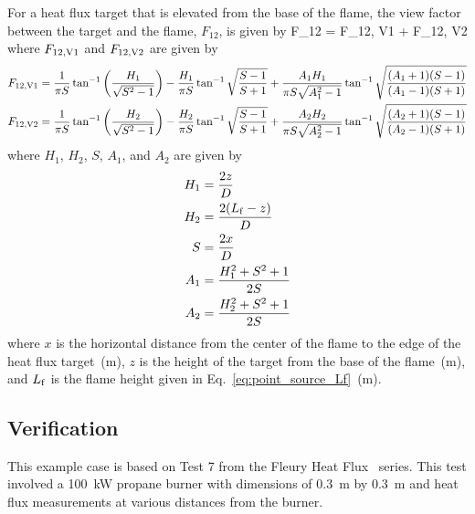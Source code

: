 \noindent For a heat flux target that is elevated from the base of the flame, the view factor between the target and the flame, $F_{12}$, is given by
\be
F_{12} = F_{\rm 12, V1} + F_{\rm 12, V2}
\label{eq:solid_flame_F12_V1V2}
\ee
where $F_{\rm 12, V1}$ and $F_{\rm 12, V2}$ are given by
\begin{align}
F_{\rm 12, V1} &= \frac{1}{\pi S} \tan^{-1} \left( \frac{H_1}{\sqrt{S^2-1}} \right) - \frac{H_1}{\pi S} \tan^{-1} \sqrt{\frac{S-1}{S+1}} +
\frac{A_1 H_1}{\pi S \sqrt{A_1^2-1}} \tan^{-1} \sqrt{\frac{(A_1+1)(S-1)}{(A_1-1)(S+1)}} \\
F_{\rm 12, V2} &= \frac{1}{\pi S} \tan^{-1} \left( \frac{H_2}{\sqrt{S^2-1}} \right) - \frac{H_2}{\pi S} \tan^{-1} \sqrt{\frac{S-1}{S+1}} +
\frac{A_2 H_2}{\pi S \sqrt{A_2^2-1}} \tan^{-1} \sqrt{\frac{(A_2+1)(S-1)}{(A_2-1)(S+1)}}
\label{eq:solid_flame_F12_V1_V2}
\end{align}
where $H_1$, $H_2$, $S$, $A_1$, and $A_2$ are given by
\begin{align}
H_1 &= \frac{2 z}{D}                \\
H_2 &= \frac{2 (L_{\rm f}-z)}{D}      \\
S   &= \frac{2 x}{D}                \\
A_1 &= \frac{H_1^2 + S^2 + 1}{2 S}  \\
A_2 &= \frac{H_2^2 + S^2 + 1}{2 S}
\label{eq:solid_flame_H_S_A}
\end{align}
where $x$ is the horizontal distance from the center of the flame to the edge of the heat
flux target~(\si{m}), $z$ is the height of the target from the base of the flame~(\si{m}),
and $L_{\rm f}$ is the flame height given in Eq.~\ref{eq:point_source_Lf}~(\si{m}).


\clearpage


\subsection*{Verification}

This example case is based on Test 7 from the Fleury Heat Flux~\cite{Fleury:Masters} series. This test involved a \SI{100}{kW} propane burner with dimensions of 0.3~m by 0.3~m and heat flux measurements at various distances from the burner.

